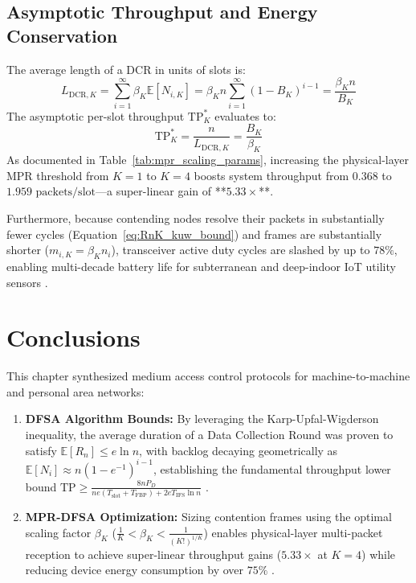 \subsection{Asymptotic Throughput and Energy Conservation}
The average length of a DCR in units of slots is:
\begin{equation}
    L_{\mathrm{DCR}, K} = \sum_{i=1}^\infty \beta_K \mathbb{E}[N_{i, K}] = \beta_K n \sum_{i=1}^\infty (1 - B_K)^{i - 1} = \frac{\beta_K n}{B_K}
\end{equation}
The asymptotic per-slot throughput $\mathrm{TP}_K^*$ evaluates to:
\begin{equation}
    \label{eq:mpr_tp_peak}
    \mathrm{TP}_K^* = \frac{n}{L_{\mathrm{DCR}, K}} = \frac{B_K}{\beta_K}
\end{equation}
As documented in Table~\ref{tab:mpr_scaling_params}, increasing the physical-layer MPR threshold from $K = 1$ to $K = 4$ boosts system throughput from $0.368$ to $1.959\text{~packets/slot}$—a super-linear gain of **$5.33\times$**.

Furthermore, because contending nodes resolve their packets in substantially fewer cycles (Equation~\eqref{eq:RnK_kuw_bound}) and frames are substantially shorter ($m_{i, K} = \beta_K n_i$), transceiver active duty cycles are slashed by up to $78\%$, enabling multi-decade battery life for subterranean and deep-indoor IoT utility sensors \cite{george2020multipacket}.



\section{Conclusions}
\label{sec:m2m_summary}

This chapter synthesized medium access control protocols for machine-to-machine and personal area networks:
\begin{enumerate}
    \item \textbf{DFSA Algorithm Bounds:} By leveraging the Karp-Upfal-Wigderson inequality, the average duration of a Data Collection Round was proven to satisfy $\mathbb{E}[R_n] \le e \ln n$, with backlog decaying geometrically as $\mathbb{E}[N_i] \approx n(1-e^{-1})^{i-1}$, establishing the fundamental throughput lower bound $\mathrm{TP} \ge \frac{8 n P_D}{n e(T_{\mathrm{slot}} + T_{\mathrm{FBP}}) + 2e T_{\mathrm{IFS}} \ln n}$ \cite{george2018performance}.
    \item \textbf{MPR-DFSA Optimization:} Sizing contention frames using the optimal scaling factor $\beta_K$ ($\frac{1}{K} < \beta_K < \frac{1}{(K!)^{1/K}}$) enables physical-layer multi-packet reception to achieve super-linear throughput gains ($5.33\times$ at $K=4$) while reducing device energy consumption by over $75\%$ \cite{george2020multipacket}.
   
\end{enumerate}